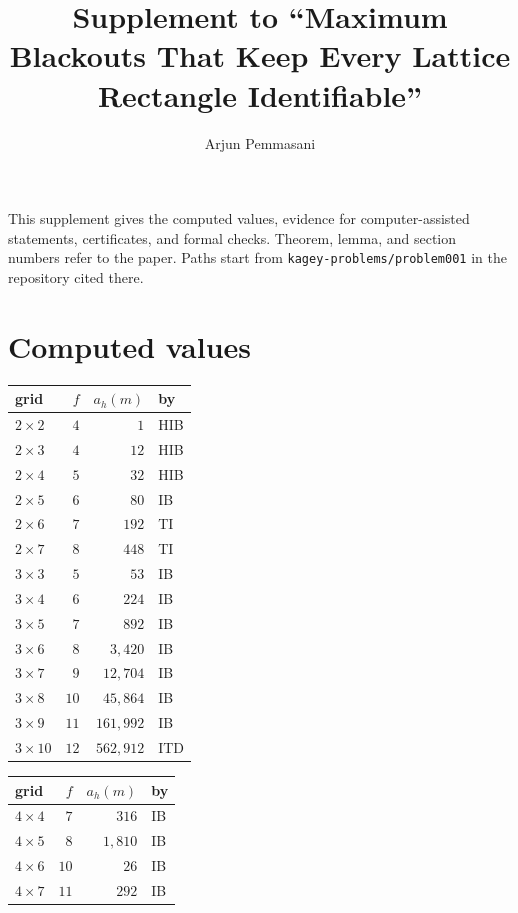 \documentclass[12pt]{article}
\title{Supplement to ``Maximum Blackouts That Keep Every Lattice Rectangle Identifiable''}
\author{Arjun Pemmasani}
\date{}
\theoremstyle{plain}
\begin{document}
\maketitle

This supplement gives the computed values, evidence for computer-assisted statements,
certificates, and formal checks. Theorem, lemma, and section numbers refer to the paper.
Paths start from \nolinkurl{kagey-problems/problem001} in the repository cited there.

\section{Computed values}

\begin{table}[!htb]
\centering\scriptsize\setlength{\tabcolsep}{3pt}
\begin{tabular}{@{}lrrl@{}}
\toprule
grid & $f$ & $a_h(m)$ & by \\
\midrule
$2\times2$ & $4$ & $1$ & HIB \\
$2\times3$ & $4$ & $12$ & HIB \\
$2\times4$ & $5$ & $32$ & HIB \\
$2\times5$ & $6$ & $80$ & IB \\
$2\times6$ & $7$ & $192$ & TI \\
$2\times7$ & $8$ & $448$ & TI \\
$3\times3$ & $5$ & $53$ & IB \\
$3\times4$ & $6$ & $224$ & IB \\
$3\times5$ & $7$ & $892$ & IB \\
$3\times6$ & $8$ & $3{,}420$ & IB \\
$3\times7$ & $9$ & $12{,}704$ & IB \\
$3\times8$ & $10$ & $45{,}864$ & IB \\
$3\times9$ & $11$ & $161{,}992$ & IB \\
$3\times10$ & $12$ & $562{,}912$ & ITD \\
\bottomrule
\end{tabular}\hspace{1.5em}
\begin{tabular}{@{}lrrl@{}}
\toprule
grid & $f$ & $a_h(m)$ & by \\
\midrule
$4\times4$ & $7$ & $316$ & IB \\
$4\times5$ & $8$ & $1{,}810$ & IB \\
$4\times6$ & $10$ & $26$ & IB \\
$4\times7$ & $11$ & $292$ & IB \\

\end{tabular}
\end{table}
\end{document}
